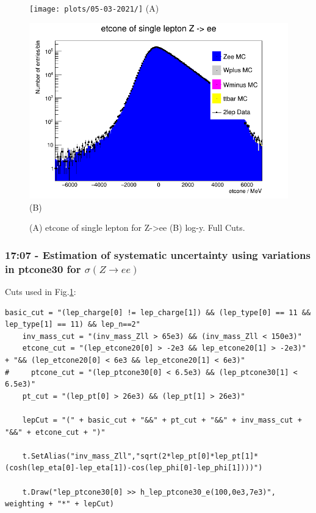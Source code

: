 \begin{figure}[h!]
    \centering
    \begin{minipage}{0.5\textwidth}
        \centering
        \texttt{[image: plots/05-03-2021/]}
        (A)
    \end{minipage}\hfill
    \begin{minipage}{0.5\textwidth}
        \centering
        \includegraphics[width=\linewidth]{plots/05-03-2021/17-07_05-03-21.png}
        (B)
    \end{minipage}
    \caption{(A) etcone of single lepton for Z->ee (B) log-y.  Full Cuts.}
    \label{}
\end{figure}


\subsubsection*{17:07 - Estimation of systematic uncertainty using variations in ptcone30 for $\sigma (Z \rightarrow ee)$}
Cuts used in Fig.\ref{}:
\begin{lstlisting}
basic_cut = "(lep_charge[0] != lep_charge[1]) && (lep_type[0] == 11 && lep_type[1] == 11) && lep_n==2"
    inv_mass_cut = "(inv_mass_Zll > 65e3) && (inv_mass_Zll < 150e3)"
    etcone_cut = "(lep_etcone20[0] > -2e3 && lep_etcone20[1] > -2e3)" + "&& (lep_etcone20[0] < 6e3 && lep_etcone20[1] < 6e3)"
#     ptcone_cut = "(lep_ptcone30[0] < 6.5e3) && (lep_ptcone30[1] < 6.5e3)"
    pt_cut = "(lep_pt[0] > 26e3) && (lep_pt[1] > 26e3)"
    
    lepCut = "(" + basic_cut + "&&" + pt_cut + "&&" + inv_mass_cut + "&&" + etcone_cut + ")"

    t.SetAlias("inv_mass_Zll","sqrt(2*lep_pt[0]*lep_pt[1]*(cosh(lep_eta[0]-lep_eta[1])-cos(lep_phi[0]-lep_phi[1])))")
   
    t.Draw("lep_ptcone30[0] >> h_lep_ptcone30_e(100,0e3,7e3)", weighting + "*" + lepCut)
\end{lstlisting}

